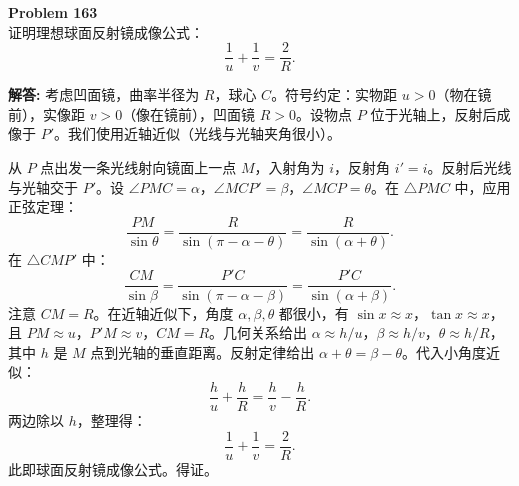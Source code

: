 \documentclass[12pt, a4paper, oneside]{ctexart}
\newenvironment{solution}{\par\noindent\textbf{解答:}\quad}{\par}
\begin{document}
\begin{mdframed}[backgroundcolor=gray!10, linewidth=0pt]
    \textbf{Problem 163} \\
    证明理想球面反射镜成像公式：
    \[
    \frac{1}{u} + \frac{1}{v} = \frac{2}{R}.
    \]
\end{mdframed}
\begin{solution}
    考虑凹面镜，曲率半径为 $R$，球心 $C$。符号约定：实物距 $u > 0$（物在镜前），实像距 $v > 0$（像在镜前），凹面镜 $R > 0$。设物点 $P$ 位于光轴上，反射后成像于 $P'$。我们使用近轴近似（光线与光轴夹角很小）。

    从 $P$ 点出发一条光线射向镜面上一点 $M$，入射角为 $i$，反射角 $i' = i$。反射后光线与光轴交于 $P'$。设 $\angle PMC = \alpha$，$\angle MCP' = \beta$，$\angle MCP = \theta$。在 $\triangle PMC$ 中，应用正弦定理：
    \[
    \frac{PM}{\sin \theta} = \frac{R}{\sin(\pi - \alpha - \theta)} = \frac{R}{\sin(\alpha + \theta)}.
    \]
    在 $\triangle CMP'$ 中：
    \[
    \frac{CM}{\sin \beta} = \frac{P'C}{\sin(\pi - \alpha - \beta)} = \frac{P'C}{\sin(\alpha + \beta)}.
    \]
    注意 $CM = R$。在近轴近似下，角度 $\alpha, \beta, \theta$ 都很小，有 $\sin x \approx x$，$\tan x \approx x$，且 $PM \approx u$，$P'M \approx v$，$CM = R$。几何关系给出 $\alpha \approx h/u$，$\beta \approx h/v$，$\theta \approx h/R$，其中 $h$ 是 $M$ 点到光轴的垂直距离。反射定律给出 $\alpha + \theta = \beta - \theta$。代入小角度近似：
    \[
    \frac{h}{u} + \frac{h}{R} = \frac{h}{v} - \frac{h}{R}.
    \]
    两边除以 $h$，整理得：
    \[
    \frac{1}{u} + \frac{1}{v} = \frac{2}{R}.
    \]
    此即球面反射镜成像公式。得证。
\end{solution}
\end{document}
